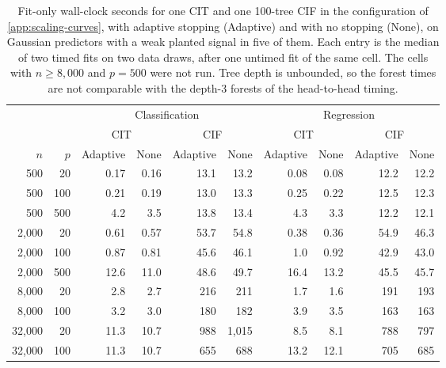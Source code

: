 \begin{table}[tb]
  \centering
  \footnotesize
  \setlength{\tabcolsep}{5pt}
  \begin{tabular}{@{}rrrrrrrrrr@{}}
    \toprule
     & & \multicolumn{4}{c}{Classification} & \multicolumn{4}{c}{Regression} \\
    \cmidrule(lr){3-6}\cmidrule(l){7-10}
     & & \multicolumn{2}{c}{CIT} & \multicolumn{2}{c}{CIF} & \multicolumn{2}{c}{CIT} & \multicolumn{2}{c}{CIF} \\
    \cmidrule(lr){3-4}\cmidrule(lr){5-6}\cmidrule(lr){7-8}\cmidrule(l){9-10}
    $n$ & $p$ & Adaptive & None & Adaptive & None & Adaptive & None & Adaptive & None \\
    \midrule
    500 & 20 & 0.17 & 0.16 & 13.1 & 13.2 & 0.08 & 0.08 & 12.2 & 12.2 \\
    500 & 100 & 0.21 & 0.19 & 13.0 & 13.3 & 0.25 & 0.22 & 12.5 & 12.3 \\
    500 & 500 & 4.2 & 3.5 & 13.8 & 13.4 & 4.3 & 3.3 & 12.2 & 12.1 \\
    2,000 & 20 & 0.61 & 0.57 & 53.7 & 54.8 & 0.38 & 0.36 & 54.9 & 46.3 \\
    2,000 & 100 & 0.87 & 0.81 & 45.6 & 46.1 & 1.0 & 0.92 & 42.9 & 43.0 \\
    2,000 & 500 & 12.6 & 11.0 & 48.6 & 49.7 & 16.4 & 13.2 & 45.5 & 45.7 \\
    8,000 & 20 & 2.8 & 2.7 & 216 & 211 & 1.7 & 1.6 & 191 & 193 \\
    8,000 & 100 & 3.2 & 3.0 & 180 & 182 & 3.9 & 3.5 & 163 & 163 \\
    32,000 & 20 & 11.3 & 10.7 & 988 & 1,015 & 8.5 & 8.1 & 788 & 797 \\
    32,000 & 100 & 11.3 & 10.7 & 655 & 688 & 13.2 & 12.1 & 705 & 685 \\
    \bottomrule
  \end{tabular}
  \caption{Fit-only wall-clock seconds for one CIT and one 100-tree CIF in the
  configuration of \cref{app:scaling-curves}, with adaptive stopping (Adaptive)
  and with no stopping (None), on Gaussian predictors with a weak planted
  signal in five of them. Each entry is the median of two timed fits on two
  data draws, after one untimed fit of the same cell. The cells with $n \ge 8{,}000$ and
  $p=500$ were not run. Tree depth is unbounded, so the forest times are not
  comparable with the depth-3 forests of the head-to-head timing.}
  \label{tab:scaling-curves}
\end{table}

